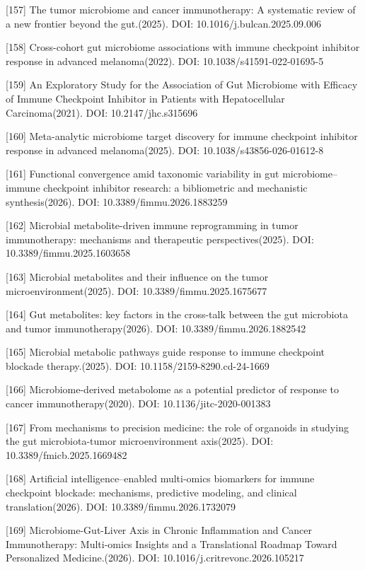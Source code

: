 {[}157{]} The tumor microbiome and cancer immunotherapy: A systematic review of a new frontier beyond the gut.(2025). DOI: 10.1016/j.bulcan.2025.09.006

{[}158{]} Cross-cohort gut microbiome associations with immune checkpoint inhibitor response in advanced melanoma(2022). DOI: 10.1038/s41591-022-01695-5

{[}159{]} An Exploratory Study for the Association of Gut Microbiome with Efficacy of Immune Checkpoint Inhibitor in Patients with Hepatocellular Carcinoma(2021). DOI: 10.2147/jhc.s315696

{[}160{]} Meta-analytic microbiome target discovery for immune checkpoint inhibitor response in advanced melanoma(2025). DOI: 10.1038/s43856-026-01612-8

{[}161{]} Functional convergence amid taxonomic variability in gut microbiome--immune checkpoint inhibitor research: a bibliometric and mechanistic synthesis(2026). DOI: 10.3389/fimmu.2026.1883259

{[}162{]} Microbial metabolite-driven immune reprogramming in tumor immunotherapy: mechanisms and therapeutic perspectives(2025). DOI: 10.3389/fimmu.2025.1603658

{[}163{]} Microbial metabolites and their influence on the tumor microenvironment(2025). DOI: 10.3389/fimmu.2025.1675677

{[}164{]} Gut metabolites: key factors in the cross-talk between the gut microbiota and tumor immunotherapy(2026). DOI: 10.3389/fimmu.2026.1882542

{[}165{]} Microbial metabolic pathways guide response to immune checkpoint blockade therapy.(2025). DOI: 10.1158/2159-8290.cd-24-1669

{[}166{]} Microbiome-derived metabolome as a potential predictor of response to cancer immunotherapy(2020). DOI: 10.1136/jitc-2020-001383

{[}167{]} From mechanisms to precision medicine: the role of organoids in studying the gut microbiota-tumor microenvironment axis(2025). DOI: 10.3389/fmicb.2025.1669482

{[}168{]} Artificial intelligence--enabled multi-omics biomarkers for immune checkpoint blockade: mechanisms, predictive modeling, and clinical translation(2026). DOI: 10.3389/fimmu.2026.1732079

{[}169{]} Microbiome-Gut-Liver Axis in Chronic Inflammation and Cancer Immunotherapy: Multi-omics Insights and a Translational Roadmap Toward Personalized Medicine.(2026). DOI: 10.1016/j.critrevonc.2026.105217

